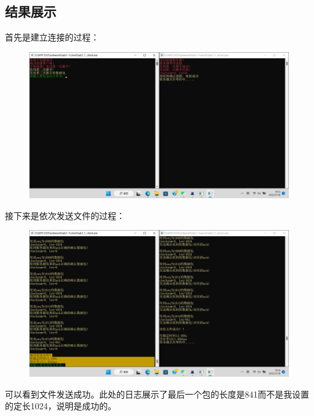 \documentclass[UTF8,a4paper,10pt]{ctexart}
\begin{document}
\subsection{结果展示}
首先是建立连接的过程：
\begin{figure}[H]
    \centering
    \includegraphics[scale=0.4]{计网6.png}
    \label{fig:6}
\end{figure}
接下来是依次发送文件的过程：
\begin{figure}[H]
    \centering
    \includegraphics[scale=0.4]{计网7.png}
    \label{fig:7}
\end{figure}
可以看到文件发送成功。此处的日志展示了最后一个包的长度是841而不是我设置的定长1024，说明是成功的。
\end{document}
